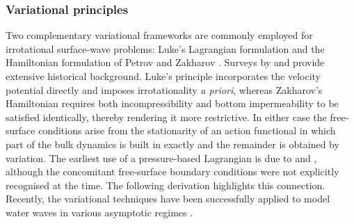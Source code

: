 \documentclass[alpha-refs, 12pt]{wiley-article}
\begin{document}
\subsubsection{Variational principles}
\label{sec:var_principles}

Two complementary variational frameworks are commonly employed for irrotational surface-wave problems: Luke's Lagrangian formulation \citep{Luke1967} and the Hamiltonian formulation of Petrov and Zakharov \citep{Petrov1964, Zakharov1968}. Surveys by \cite{Radder1999} and \cite{Zakharov1997} provide extensive historical background. Luke's principle incorporates the velocity potential directly and imposes irrotationality \emph{a priori}, whereas Zakharov's Hamiltonian requires both incompressibility and bottom impermeability to be satisfied identically, thereby rendering it more restrictive. In either case the free‐surface conditions arise from the stationarity of an action functional in which part of the bulk dynamics is built in exactly and the remainder is obtained by variation. The earliest use of a pressure‐based Lagrangian is due to \cite{Clebsch1859} and \cite{Hargreaves1908}, although the concomitant free‐surface boundary conditions were not explicitly recognised at the time. The following derivation highlights this connection. Recently, the variational techniques have been successfully applied to model water waves in various asymptotic regimes \citep{Clamond2009,Clamond2024}.
\end{document}
